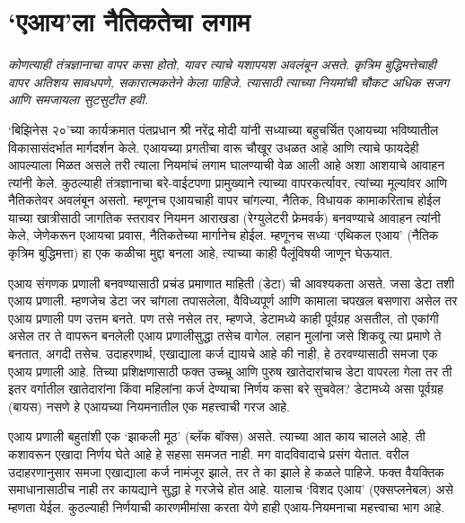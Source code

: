 \chapter{`एआय'ला नैतिकतेचा लगाम}

{\textit{कोणत्याही तंत्रज्ञानाचा वापर कसा होतो,  यावर त्याचे यशापयश अवलंबून असते.  कृत्रिम बुद्धिमत्तेचाही वापर अतिशय सावधपणे,  सकारात्मकतेने केला पाहिजे. त्यासाठी त्याच्या नियमांची चौकट अधिक सजग आणि समजायला सुटसुटीत हवी. }}

\vspace{1.5em}

`बिझिनेस २०'च्या कार्यक्रमात पंतप्रधान श्री नरेंद्र मोदी यांनी सध्याच्या बहुचर्चित एआयच्या भविष्यातील विकासासंदर्भात मार्गदर्शन केले. एआयच्या प्रगतीचा वारू चौखूर उधळत आहे आणि त्याचे फायदेही आपल्याला मिळत असले तरी त्याला नियमांचं लगाम घालण्याची वेळ आली आहे अशा आशयाचे आवाहन त्यांनी केले. कुठल्याही तंत्रज्ञानाचा बरे-वाईटपणा प्रामुख्याने त्याच्या वापरकर्त्यावर, त्यांच्या मूल्यांवर आणि नैतिकतेवर अवलंबून असतो. म्हणूनच एआयचाही वापर चांगल्या, नैतिक, विधायक कामाकरिताच होईल याच्या खात्रीसाठी जागतिक स्तरावर नियमन आराखडा (रेग्युलेटरी फ्रेमवर्क) बनवण्याचे आवाहन त्यांनी केले, जेणेकरून एआयचा प्रवास, नैतिकतेच्या मार्गानेच होईल. म्हणूनच सध्या `एथिकल एआय' (नैतिक कृत्रिम बुद्धिमत्ता) हा एक कळीचा मुद्दा बनला आहे, त्याच्या काही पैलूंविषयी जाणून घेऊयात.

एआय संगणक प्रणाली बनवण्यासाठी प्रचंड प्रमाणात माहिती (डेटा) ची आवश्यकता असते. जसा डेटा तशी एआय प्रणाली. म्हणजेच डेटा जर चांगला तपासलेला, वैविध्यपूर्ण आणि कामाला चपखल बसणारा असेल तर एआय प्रणाली पण उत्तम बनते. पण तसे नसेल तर, म्हणजे, डेटामध्ये काही पूर्वग्रह असतील, तो एकांगी असेल तर ते वापरून बनलेली एआय प्रणालीसुद्धा तसेच वागेल. लहान मुलांना जसे शिकवू त्या प्रमाणे ते बनतात, अगदी तसेच. उदाहरणार्थ, एखाद्याला कर्ज द्यायचे आहे की नाही, हे ठरवण्यासाठी समजा एक एआय प्रणाली आहे. तिच्या प्रशिक्षणासाठी फक्त उच्च्भ्रू आणि पुरुष खातेदारांचाच डेटा वापरला गेला तर ती इतर वर्गातील खातेदारांना किंवा महिलांना कर्ज देण्याचा निर्णय कसा बरे सुचवेल? डेटामध्ये असा पूर्वग्रह (बायस) नसणे हे एआयच्या नियमनातील एक महत्त्वाची गरज आहे.

एआय प्रणाली बहुतांशी एक `झाकली मूठ' (ब्लॅक बॉक्स) असते. त्याच्या आत काय चालले आहे, ती कशावरून एखादा निर्णय घेते आहे हे सहसा समजत नाही. मग वादविवादाचे प्रसंग येतात. वरील उदाहरणानुसार समजा एखाद्याला कर्ज नामंजूर झाले, तर ते का झाले हे कळले पाहिजे. फक्त वैयक्तिक समाधानासाठीच नाही तर कायद्याने सुद्धा हे गरजेचे होत आहे. यालाच `विशद एआय' (एक्सप्लनेबल) असे म्हणता येईल. कुठल्याही निर्णयाची कारणमीमांसा करता येणे हाही एआय-नियमनाचा महत्त्वाचा  भाग आहे.

